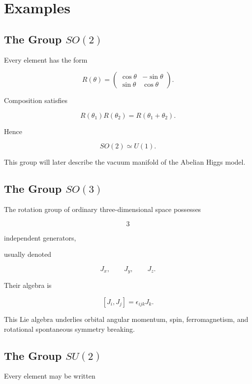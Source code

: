 \section{Examples}

\subsection{The Group \(SO(2)\)}

Every element has the form

\[
R(\theta)
=
\begin{pmatrix}
\cos\theta&
-\sin\theta\\
\sin\theta&
\cos\theta
\end{pmatrix}.
\]

Composition satisfies

\[
R(\theta_1)
R(\theta_2)
=
R(\theta_1+\theta_2).
\]

Hence

\[
SO(2)
\simeq
U(1).
\]

This group will later describe the vacuum manifold of the Abelian Higgs
model.


\subsection{The Group \(SO(3)\)}

The rotation group of ordinary three-dimensional space possesses

\[
3
\]

independent generators,

usually denoted

\[
J_x,
\qquad
J_y,
\qquad
J_z.
\]

Their algebra is

\[
[J_i,J_j]
=
\epsilon_{ijk}
J_k.
\]

This Lie algebra underlies orbital angular momentum,
spin,
ferromagnetism,
and rotational spontaneous symmetry breaking.


\subsection{The Group \(SU(2)\)}

Every element may be written

